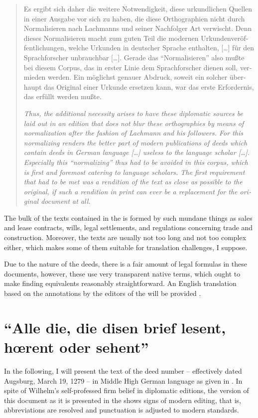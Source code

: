 \documentclass[12pt,paper=a4]{scrartcl}
\begin{document}
\foreignblockquote{german}{\begin{multicols}{2}Es ergibt sich daher die weitere Notwendigkeit, diese urkundlichen Quellen in einer Ausgabe vor sich zu haben, die diese Orthographien nicht durch Normalisieren nach Lachmanns und seiner Nachfolger Art verwischt. Denn dieses Normalisieren macht zum guten Teil die modernen Urkundenveröffentlichungen, welche Urkunden in deutscher Sprache enthalten, […] für den Sprachforscher unbrauchbar […]. Gerade das \enquote{Normalisieren} also mußte bei diesem Corpus, das in erster Linie dem Sprachforscher dienen soll, vermieden werden. Ein möglichst genauer Abdruck, soweit ein solcher überhaupt das Original einer Urkunde ersetzen kann, war das erste Erfordernis, das erfüllt werden mußte. \autocite[LX]{CAO1}

\columnbreak

{\itshape Thus, the additional necessity arises to have these diplomatic sources be laid out in an edition that does not blur these orthographies by means of normalization after the fashion of Lachmann and his followers. For this normalizing renders the better part of modern publications of deeds which contain deeds in German language […] useless to the language scholar […]. Especially this \enquote{normalizing} thus had to be avoided in this corpus, which is first and foremost catering to language scholars. The first requirement that had to be met was a rendition of the text as close as possible to the original, if such a rendition in print can ever be a replacement for the original document at all.}\end{multicols}}

The bulk of the texts contained in the  is formed by such mundane things as sales and lease contracts, wills, legal settlements, and regulations concerning trade and construction. Moreover, the texts are usually not too long and not too complex either, which makes some of them suitable for translation challenges, I suppose.

Due to the nature of the deeds, there is a fair amount of legal formulas in these documents, however, these use very transparent native terms, which ought to make finding equivalents reasonably straightforward. An English translation based on the annotations by the editors of the  will be provided \autocite[see][]{n163-online}.

\section{\enquote{Alle die, die disen brief lesent, hœrent oder sehent}}
In the following, I will present the text of the deed number  -- effectively dated Augsburg, March 19, 1279 -- in Middle High German language as given in \textcites{n163}{n163-online}. In spite of Wilhelm's self-professed firm belief in diplomatic editions, the version of this document as it is presented in the  shows signs of modern editing, that is, abbreviations are resolved and punctuation is adjusted to modern standards.
\end{document}
